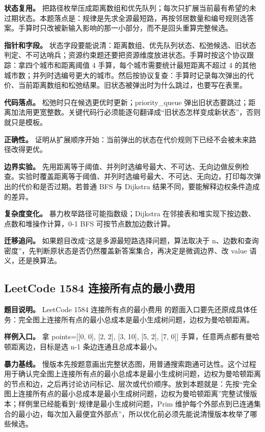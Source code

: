 \textbf{状态复用。} 把路径枚举压成距离数组和优先队列；每次只扩展当前最有希望的未过期状态。本题落点是：规律是先求全源最短路，再按邻居数量和编号规则选答案。手算时只改被新输入影响的那一小部分，而不是回头重算完整候选。

\textbf{指针和字段。} 状态字段要能说清：距离数组、优先队列状态、松弛候选、旧状态判定、不可达哨兵；资源约束题还要把资源维度放进状态。手算时按这个协议跟踪：拿四个城市和距离阈值 4 手算，每个城市需要统计最短距离不超过 4 的其他城市数；并列时选编号更大的城市。然后按协议复查：手算时记录每次弹出的代价、当前距离数组和松弛结果。旧状态被弹出时为什么跳过，也要写在表里。

\textbf{代码落点。} 松弛时只在候选更优时更新；priority\_queue 弹出旧状态要跳过；距离加法用更宽整数。关键代码行必须能逐句翻译成“旧状态怎样变成新状态”，否则就只是模板。

\textbf{正确性。} 证明从扩展顺序开始：当前弹出的状态在代价规则下已经不会被未来路径改得更优。

\textbf{边界实验。} 先用距离等于阈值、并列时选编号最大、不可达、无向边做反例检查。实验时覆盖距离等于阈值、并列时选编号最大、不可达、无向边，打印每次弹出的代价和是否过期。若普通 BFS 与 Dijkstra 结果不同，要能解释边权条件造成的差异。

\textbf{复杂度变化。} 暴力枚举路径可能指数级；Dijkstra 在邻接表和堆实现下按边数、点数和堆操作计算，0-1 BFS 可按节点数加边数计算。

\textbf{迁移追问。} 如果题目改成“这是多源最短路选择问题，算法取决于 n、边数和查询密度”，先判断原状态是否仍然覆盖新答案集合，再决定是微调边界、改 value 语义，还是换算法。

\subsection{LeetCode 1584 连接所有点的最小费用}

\textbf{题目说明。} LeetCode 1584 连接所有点的最小费用 的题面入口要先还原成具体任务：完全图上连接所有点的最小总成本是最小生成树问题，边权为曼哈顿距离。

\textbf{样例入口。} 拿 points=[[0, 0], [2, 2], [3, 10], [5, 2], [7, 0]] 手算，任意两点都有曼哈顿距离边，目标是选 n-1 条边连通且总成本最小。

\textbf{暴力基线。} 慢版本先按题意画出完整状态图，用普通搜索跑通可达性。这个过程用于确认完全图上连接所有点的最小总成本是最小生成树问题，边权为曼哈顿距离的节点和边，之后再讨论访问标记、层次或代价顺序。放到本题就是：先按“完全图上连接所有点的最小总成本是最小生成树问题，边权为曼哈顿距离”完整试慢版本；样例里已经能看到“规律是最小生成树问题，Prim 维护每个外部点到已连通集合的最小边，每次加入最便宜外部点”，所以优化前必须先能说清慢版本枚举了哪些候选。

